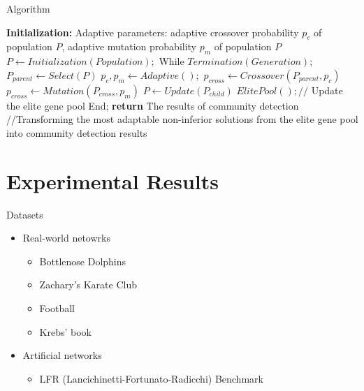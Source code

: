 \documentclass[aspectratio=169,xcolor=dvipsnames]{beamer}
\begin{document}
\begin{frame}{Algorithm}
    \begin{algorithm}[H]
        \begin{algorithmic}[1]
        \STATE \textbf{Initialization:} Adaptive parameters: adaptive crossover probability $p_{c}$ of
        population $P$, adaptive mutation probability $p_{m}$ of population $P$
        \STATE $P \leftarrow Initialization(Population);$
        \STATE While $Termination(Generation)$;
        \STATE $P_{parent} \leftarrow Select(P)$
        \STATE $p_{c}, p_{m} \leftarrow Adaptive();$
        \STATE $p_{cross} \leftarrow Crossover(P_{parent}, p_{c})$
        \STATE $p_{cross} \leftarrow Mutation(P_{cross}, p_{m})$
        \STATE $P \leftarrow Update(P_{child})$
        \STATE $ElitePool();//$ {Update the elite gene pool}
        \STATE End;
        \STATE \textbf{return} The results of community detection //{Transforming the most adaptable non-inferior solutions from the elite gene pool into community detection results}
        \end{algorithmic}
        \caption{Framework of F-SGCD Algorithm}
        \label{alg:seq}
    \end{algorithm}
\end{frame}


\section{Experimental Results}

\begin{frame}{Datasets}
    \begin{itemize}
        \item Real-world netowrks\\
        \begin{itemize}
            \item Bottlenose Dolphins
            \item Zachary's Karate Club
            \item Football
            \item Krebs' book
        \end{itemize}
        \item Artificial networks \\
        \begin{itemize}
            \item LFR (Lancichinetti-Fortunato-Radicchi) Benchmark
        \end{itemize}
    \end{itemize}
\end{frame}
\end{document}
